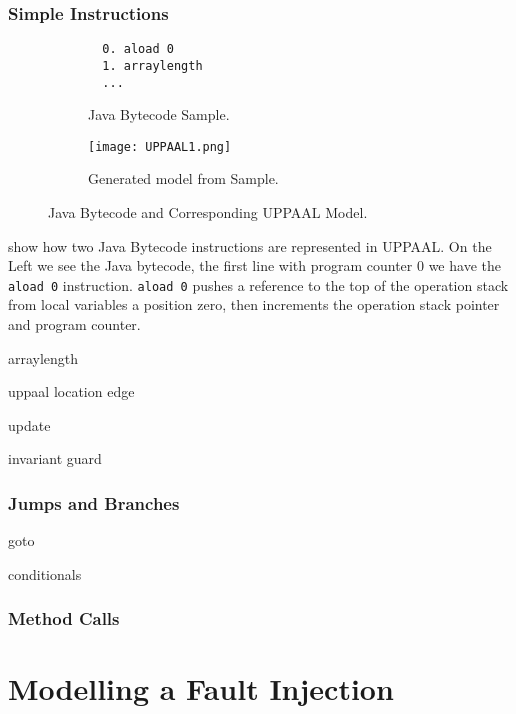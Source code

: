 \subsubsection{Simple Instructions}
\begin{figure}[H]
\centering
\begin{subfigure}{.3\textwidth}
  \begin{lstlisting}
  0. aload 0
  1. arraylength
  ...
  \end{lstlisting}
  \caption{Java Bytecode Sample.}
\end{subfigure} 
\hspace{10px}
\begin{subfigure}{.6\textwidth}
  \texttt{[image: UPPAAL1.png]}
  \caption{Generated model from Sample.}
\end{subfigure}
\caption{Java Bytecode and Corresponding UPPAAL Model.}
\label{fig:uppaal1}
\end{figure}
 show how two Java Bytecode instructions are represented in UPPAAL. On the Left we see the Java bytecode, the first line with program counter 0 we have the \texttt{aload 0} instruction. \texttt{aload 0} pushes a reference to the top of the operation stack from local variables a position zero, then increments the operation stack pointer and program counter.

arraylength

uppaal location edge

update

invariant guard

\subsubsection{Jumps and Branches}
goto

conditionals
\subsubsection{Method Calls}


\section{Modelling a Fault Injection}
